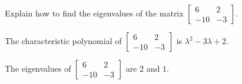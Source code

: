
\begin{exerciseStatement}


Explain how to find the eigenvalues of the matrix \( \left[\begin{array}{cc}
6 & 2 \\
-10 & -3
\end{array}\right] \).


\end{exerciseStatement}
    
\begin{exerciseAnswer} 


The characteristic polynomial of \( \left[\begin{array}{cc}
6 & 2 \\
-10 & -3
\end{array}\right] \) is \( \lambda^{2} - 3 \lambda + 2 \).



The eigenvalues of \( \left[\begin{array}{cc}
6 & 2 \\
-10 & -3
\end{array}\right] \) are \( 2 \) and \( 1 \).


\end{exerciseAnswer}
    
